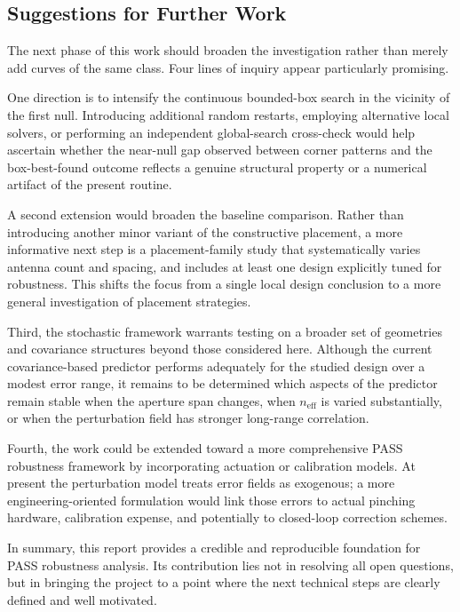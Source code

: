 \subsection{Suggestions for Further Work}

The next phase of this work should broaden the investigation rather than merely add curves of the same class. Four lines of inquiry appear particularly promising.

One direction is to intensify the continuous bounded-box search in the vicinity of the first null. Introducing additional random restarts, employing alternative local solvers, or performing an independent global-search cross-check would help ascertain whether the near-null gap observed between corner patterns and the box-best-found outcome reflects a genuine structural property or a numerical artifact of the present routine.

A second extension would broaden the baseline comparison. Rather than introducing another minor variant of the constructive placement, a more informative next step is a placement-family study that systematically varies antenna count and spacing, and includes at least one design explicitly tuned for robustness. This shifts the focus from a single local design conclusion to a more general investigation of placement strategies.

Third, the stochastic framework warrants testing on a broader set of geometries and covariance structures beyond those considered here. Although the current covariance-based predictor performs adequately for the studied design over a modest error range, it remains to be determined which aspects of the predictor remain stable when the aperture span changes, when $n_{\mathrm{eff}}$ is varied substantially, or when the perturbation field has stronger long-range correlation.

Fourth, the work could be extended toward a more comprehensive PASS robustness framework by incorporating actuation or calibration models. At present the perturbation model treats error fields as exogenous; a more engineering-oriented formulation would link those errors to actual pinching hardware, calibration expense, and potentially to closed-loop correction schemes.

In summary, this report provides a credible and reproducible foundation for PASS robustness analysis. Its contribution lies not in resolving all open questions, but in bringing the project to a point where the next technical steps are clearly defined and well motivated.
